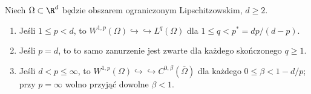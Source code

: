 \begin{twierdzenie}
\label{thm:pde10-Rellich-q}
Niech $\Omega\subset\R^d$ będzie obszarem ograniczonym Lipschitzowskim, $d\ge2$.
\begin{enumerate}[label=\textnormal{(\roman*)}]
\item Jeśli $1\le p<d$, to
$W^{1,p}(\Omega)\hookrightarrow\hookrightarrow L^q(\Omega)$
dla $1\le q<p^*=dp/(d-p)$.
\item Jeśli $p=d$, to to samo zanurzenie jest zwarte dla
każdego skończonego $q\ge1$.
\item Jeśli $d<p\le\infty$, to
$W^{1,p}(\Omega)\hookrightarrow\hookrightarrow
C^{0,\beta}(\overline\Omega)$
dla każdego $0\le\beta<1-d/p$; przy $p=\infty$ wolno
przyjąć dowolne $\beta<1$.
\end{enumerate}
\end{twierdzenie}
